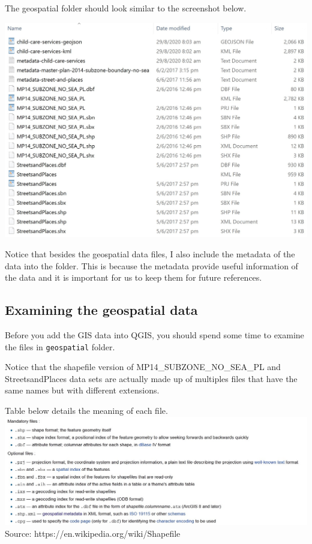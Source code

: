 \documentclass[
  letterpaper,
  DIV=11,
  numbers=noendperiod]{scrreprt}
\begin{document}
The geospatial folder should look similar to the screenshot below.

\includegraphics{./img02/image1.jpg}

Notice that besides the geospatial data files, I also include the
metadata of the data into the folder. This is because the metadata
provide useful information of the data and it is important for us to
keep them for future references.

\hypertarget{examining-the-geospatial-data}{%
\subsection{Examining the geospatial
data}\label{examining-the-geospatial-data}}

Before you add the GIS data into QGIS, you should spend some time to
examine the files in \texttt{geospatial} folder.

Notice that the shapefile version of MP14\_SUBZONE\_NO\_SEA\_PL and
StreetsandPlaces data sets are actually made up of multiples files that
have the same names but with different extensions.

Table below details the meaning of each file.
\includegraphics{./img02/image2.jpg} Source:
https://en.wikipedia.org/wiki/Shapefile
\end{document}
